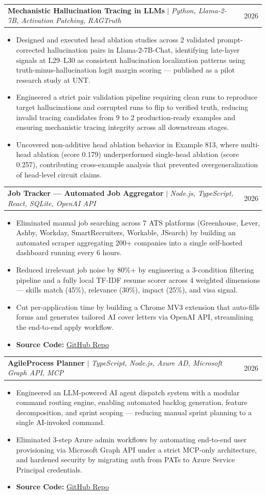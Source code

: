 \documentclass[letterpaper,10pt]{article}
\makeatletter
\newcommand{\resumeItem}[1]{
  \item\small{
    {#1 \vspace{-2pt}}
  }
}
\newcommand{\resumeProjectHeading}[2]{
    \item
    \begin{tabular*}{0.97\textwidth}{l@{\extracolsep{\fill}}r}
      \small#1 & #2 \\
    \end{tabular*}\vspace{-7pt}
}
\newcommand{\resumeItemListStart}{\begin{itemize}}
\newcommand{\resumeItemListEnd}{\end{itemize}\vspace{-5pt}}
\makeatother
\begin{document}
      \resumeProjectHeading
          {\textbf{Mechanistic Hallucination Tracing in LLMs} $|$ \emph{Python, Llama-2-7B, Activation Patching, RAGTruth}}{2026}
          \resumeItemListStart
            \resumeItem{Designed and executed head ablation studies across 2 validated prompt-corrected hallucination pairs in Llama-2-7B-Chat, identifying late-layer signals at L29--L30 as consistent hallucination localization patterns using truth-minus-hallucination logit margin scoring — published as a pilot research study at UNT.}
            \resumeItem{Engineered a strict pair validation pipeline requiring clean runs to reproduce target hallucinations and corrupted runs to flip to verified truth, reducing invalid tracing candidates from 9 to 2 production-ready examples and ensuring mechanistic tracing integrity across all downstream stages.}
            \resumeItem{Uncovered non-additive head ablation behavior in Example 813, where multi-head ablation (score 0.179) underperformed single-head ablation (score 0.257), contributing cross-example analysis that prevented overgeneralization of head-level circuit claims.}
          \resumeItemListEnd

      \resumeProjectHeading
          {\textbf{Job Tracker — Automated Job Aggregator} $|$ \emph{Node.js, TypeScript, React, SQLite, OpenAI API}}{2026}
          \resumeItemListStart
            \resumeItem{Eliminated manual job searching across 7 ATS platforms (Greenhouse, Lever, Ashby, Workday, SmartRecruiters, Workable, JSearch) by building an automated scraper aggregating 200+ companies into a single self-hosted dashboard running every 6 hours.}
            \resumeItem{Reduced irrelevant job noise by 80\%+ by engineering a 3-condition filtering pipeline and a fully local TF-IDF resume scorer across 4 weighted dimensions — skills match (45\%), relevance (30\%), impact (25\%), and visa signal.}
            \resumeItem{Cut per-application time by building a Chrome MV3 extension that auto-fills forms and generates tailored AI cover letters via OpenAI API, streamlining the end-to-end apply workflow.}
            \resumeItem{\textbf{Source Code:} \href{https://github.com/priyabrataunt/job_automation}{\underline{GitHub Repo}}}
          \resumeItemListEnd

      \resumeProjectHeading
          {\textbf{AgileProcess Planner} $|$ \emph{TypeScript, Node.js, Azure AD, Microsoft Graph API, MCP}}{2026}
          \resumeItemListStart
            \resumeItem{Engineered an LLM-powered AI agent dispatch system with a modular command routing engine, enabling automated backlog generation, feature decomposition, and sprint scoping — reducing manual sprint planning to a single AI-invoked command.}
            \resumeItem{Eliminated 3-step Azure admin workflows by automating end-to-end user provisioning via Microsoft Graph API under a strict MCP-only architecture, and hardened security by migrating auth from PATs to Azure Service Principal credentials.}
            \resumeItem{\textbf{Source Code:} \href{https://github.com/workasaservice/agileprocess-planner}{\underline{GitHub Repo}}}
          \resumeItemListEnd
\end{document}

